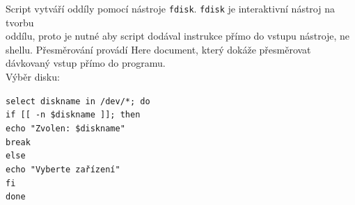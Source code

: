 \documentclass[12pt,a4paper,twoside,]{article}
\begin{document}
{Script vytváří oddíly pomocí nástroje \texttt{fdisk}. \texttt{fdisk} je interaktivní nástroj na tvorbu \\oddílu, proto je nutné aby script dodával instrukce přímo do vstupu nástroje, ne shellu. Přesměrování provádí Here document, který dokáže přesměrovat dávkovaný vstup přímo do programu.\\ Výběr disku:}

\texttt{select diskname in /dev/*; do\\}
\texttt{if [[ -n \$diskname ]]; then\\}
\texttt{\hspace*{2em}echo "Zvolen: \$diskname"\\}
\texttt{\hspace*{2em}break\\}
\texttt{else\\}
\texttt{\hspace*{2em}echo "Vyberte zařízení"\\}
\texttt{fi\\}
\texttt{done\\}
\end{document}
